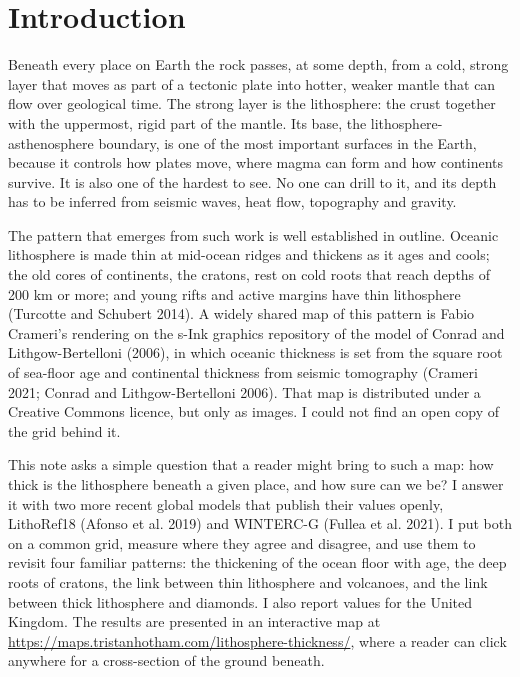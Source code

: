 \documentclass[11pt,a4paper]{article}
\begin{document}
\section{Introduction}

Beneath every place on Earth the rock passes, at some depth, from a cold, strong layer that moves as part of a tectonic plate into hotter, weaker mantle that can flow over geological time. The strong layer is the lithosphere: the crust together with the uppermost, rigid part of the mantle. Its base, the lithosphere-asthenosphere boundary, is one of the most important surfaces in the Earth, because it controls how plates move, where magma can form and how continents survive. It is also one of the hardest to see. No one can drill to it, and its depth has to be inferred from seismic waves, heat flow, topography and gravity.

The pattern that emerges from such work is well established in outline. Oceanic lithosphere is made thin at mid-ocean ridges and thickens as it ages and cools; the old cores of continents, the cratons, rest on cold roots that reach depths of 200 km or more; and young rifts and active margins have thin lithosphere (Turcotte and Schubert 2014). A widely shared map of this pattern is Fabio Crameri's rendering on the s-Ink graphics repository of the model of Conrad and Lithgow-Bertelloni (2006), in which oceanic thickness is set from the square root of sea-floor age and continental thickness from seismic tomography (Crameri 2021; Conrad and Lithgow-Bertelloni 2006). That map is distributed under a Creative Commons licence, but only as images. I could not find an open copy of the grid behind it.

This note asks a simple question that a reader might bring to such a map: how thick is the lithosphere beneath a given place, and how sure can we be? I answer it with two more recent global models that publish their values openly, LithoRef18 (Afonso et al. 2019) and WINTERC-G (Fullea et al. 2021). I put both on a common grid, measure where they agree and disagree, and use them to revisit four familiar patterns: the thickening of the ocean floor with age, the deep roots of cratons, the link between thin lithosphere and volcanoes, and the link between thick lithosphere and diamonds. I also report values for the United Kingdom. The results are presented in an interactive map at \url{https://maps.tristanhotham.com/lithosphere-thickness/}, where a reader can click anywhere for a cross-section of the ground beneath.
\end{document}
